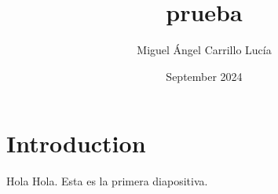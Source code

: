\documentclass{beamer}
\title{prueba}
\author{Miguel Ángel Carrillo Lucía}
\date{September 2024}
\begin{document}
\maketitle

\section{Introduction}

\begin{frame}{Hola}
    Hola. Esta es la primera diapositiva.
\end{frame}
\end{document}
